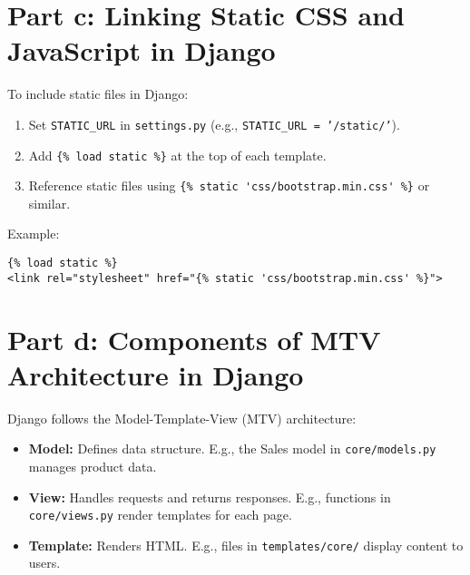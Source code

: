\documentclass[12pt]{article}
\begin{document}
\section{Part c: Linking Static CSS and JavaScript in Django}
To include static files in Django:
\begin{enumerate}
    \item Set \texttt{STATIC\_URL} in \texttt{settings.py} (e.g., \texttt{STATIC\_URL = '/static/'}).
    \item Add \verb|{% load static %}| at the top of each template.
    \item Reference static files using \verb|{% static 'css/bootstrap.min.css' %}| or similar.
\end{enumerate}
Example:
\begin{verbatim}
{% load static %}
<link rel="stylesheet" href="{% static 'css/bootstrap.min.css' %}">
\end{verbatim}

\section{Part d: Components of MTV Architecture in Django}
Django follows the Model-Template-View (MTV) architecture:
\begin{itemize}
    \item \textbf{Model:} Defines data structure. E.g., the Sales model in \texttt{core/models.py} manages product data.
    \item \textbf{View:} Handles requests and returns responses. E.g., functions in \texttt{core/views.py} render templates for each page.
    \item \textbf{Template:} Renders HTML. E.g., files in \texttt{templates/core/} display content to users.
\end{itemize}
\end{document}
